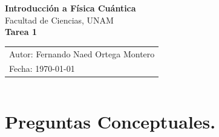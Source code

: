 \documentclass[12pt,a4paper]{article}
\begin{document}
\begin{center}
    {\LARGE \textbf{Introducción a Física Cuántica}} \\[0.4cm]

    {\large Facultad de Ciencias, UNAM} \\[0.6cm]

    \large \textbf{Tarea 1} \\[0.2cm]

    \begin{tabular}{l}
        \small Autor: Fernando Naed Ortega Montero\\
        \small Fecha: \today
    \end{tabular}
\end{center}
\[\] %



\section*{Preguntas Conceptuales.}
\end{document}
